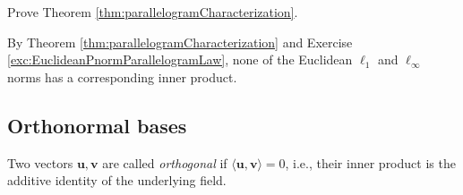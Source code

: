 \begin{exc}
  Prove Theorem \ref{thm:parallelogramCharacterization}.
\end{exc}

\begin{exm}
  By Theorem \ref{thm:parallelogramCharacterization}
  and Exercise \ref{exc:EuclideanPnormParallelogramLaw},
  none of the Euclidean $\ell_1$ and $\ell_{\infty}$ norms
  has a corresponding inner product.
\end{exm}


\subsection{Orthonormal bases}
\label{sec:orthonormal-bases}

\begin{defn}
  \label{def:orthogonalVectors}
  Two vectors $\mathbf{u}, \mathbf{v}$ are called \emph{orthogonal}
  if $\langle \mathbf{u}, \mathbf{v}\rangle=0$,
  i.e., their inner product is the additive identity of the underlying
  field.
\end{defn}

